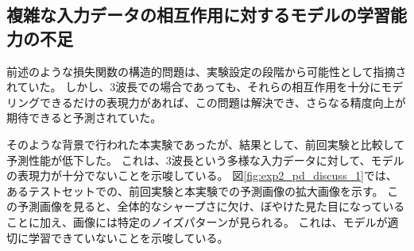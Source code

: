     \subsection{複雑な入力データの相互作用に対するモデルの学習能力の不足}
    前述のような損失関数の構造的問題は、実験設定の段階から可能性として指摘されていた。
    しかし、3波長での場合であっても、それらの相互作用を十分にモデリングできるだけの表現力があれば、この問題は解決でき、さらなる精度向上が期待できると予測されていた。

    そのような背景で行われた本実験であったが、結果として、前回実験と比較して予測性能が低下した。
    これは、3波長という多様な入力データに対して、モデルの表現力が十分でないことを示唆している。
    図\ref{fig:exp2_pd_discuss_1}では、あるテストセットでの、前回実験と本実験での予測画像の拡大画像を示す。
    この予測画像を見ると、全体的なシャープさに欠け、ぼやけた見た目になっていることに加え、画像には特定のノイズパターンが見られる。
    これは、モデルが適切に学習できていないことを示唆している。
